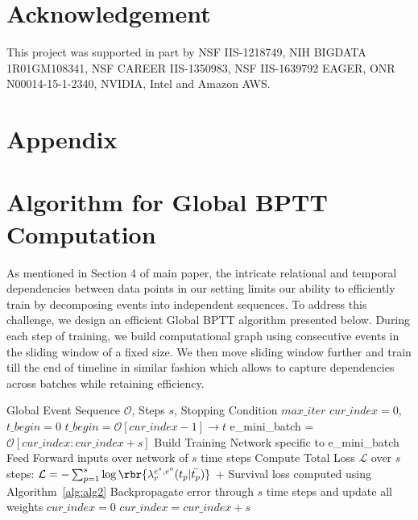 \documentclass{article}
\begin{document}
\section*{Acknowledgement}
This project was supported in part by NSF IIS-1218749, NIH BIGDATA 1R01GM108341, NSF CAREER IIS-1350983, NSF IIS-1639792 EAGER, ONR N00014-15-1-2340, NVIDIA, Intel and Amazon AWS.

\vspace{-0.4cm}
% 


\newpage
\onecolumn
\appendix
\section*{Appendix}
\section{Algorithm for Global BPTT Computation}
\label{sec:alg2}
As mentioned in Section 4 of main paper, the intricate relational and temporal dependencies between data points in our setting limits our ability to efficiently train by decomposing events into independent sequences. To address this challenge, we design an efficient Global BPTT algorithm presented below. During each step of training, we build computational graph using consecutive events in the sliding window of a fixed size. We then move sliding window further and train till the end of timeline in similar fashion which allows to capture dependencies across batches while retaining efficiency.

\setcounter{algorithm}{1}
\begin{algorithm}[h!]
   \caption{Global-BPTT}
   \label{alg:alg1}
\begin{algorithmic}
    Global Event Sequence $\mathcal{O}$, Steps $s$, Stopping Condition $max\_iter$
   \STATE $cur\_index = 0$, $t\_begin = 0$
   \STATE $t\_begin = \mathcal{O}[cur\_index - 1] \rightarrow t$
   \ENDIF
   \STATE e\_mini\_batch = $\mathcal{O}[cur\_index : cur\_index + s]$
   \STATE Build Training Network specific to e\_mini\_batch
   \STATE Feed Forward inputs over network of $s$ time steps
   \STATE Compute Total Loss $\mathcal{L} $ over $s$ steps:
   \STATE $\mathcal{L} = - \sum_{p=1}^s \log\rbr{\lambda^{e^s,e^o}_{r}(t_p|\bar{t_p})}$ + Survival loss computed using Algorithm~\ref{alg:alg2}
   \STATE Backpropagate error through $s$ time steps and update all weights
   \STATE $cur\_index = 0$
   \ELSE 
   \STATE $cur\_index = cur\_index + s$ 
   \ENDIF 

   \ENDFOR
\end{algorithmic}
\end{algorithm}
\end{document}
